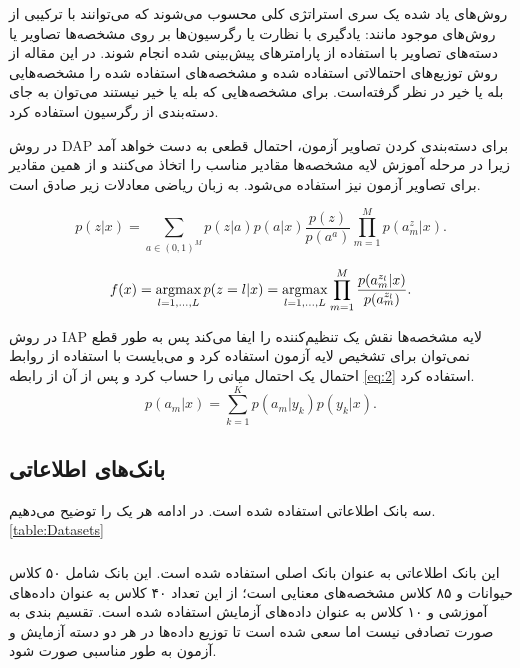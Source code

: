 روش‌های یاد شده یک سری استراتژی کلی محسوب می‌شوند که می‌توانند با ترکیبی از روش‌‌های موجود مانند: یادگیری با نظارت یا رگرسیون‌ها  بر روی مشخصه‌ها تصاویر یا دسته‌های تصاویر با استفاده از پارامتر‌های پیش‌بینی شده انجام شوند. در این مقاله از روش توزیع‌های احتمالاتی استفاده شده و مشخصه‌های استفاده شده را مشخصه‌هایی بله یا خیر در نظر گرفته‌است. برای مشخصه‌هایی که بله یا خیر نیستند می‌توان به جای دسته‌بندی از رگرسیون استفاده کرد.

در روش DAP برای دسته‌بندی کردن تصاویر آزمون، احتمال قطعی به دست خواهد آمد زیرا در مرحله آموزش لایه مشخصه‌ها مقادیر مناسب را اتخاذ می‌کنند و از همین مقادیر برای تصاویر آزمون نیز استفاده می‌شود. به زبان ریاضی معادلات زیر صادق است.


\begin{equation}
p(z|x) = \sum_{a\in(0,1)^{M}} p(z|a)p(a|x)\dfrac{p(z)}{p(a^{a})}\prod_{m=1}^{M} p(a_{m}^{z}|x).
\end{equation}

\begin{equation}
f(x) = \operatorname*{argmax}\limits_{l=1,...,L} p(z=l|x) = \operatorname*{argmax}\limits_{l=1,...,L} \prod_{m=1}^{M} \dfrac{p(a_{m}^{z_{l}}|x)}{p(a_{m}^{z_{l}})}.
\label{eq:2}
\end{equation}

در روش IAP لایه مشخصه‌ها نقش یک تنظیم‌کننده را ایفا می‌کند پس به طور قطع نمی‌توان برای تشخیص لایه آزمون استفاده کرد و می‌بایست با استفاده از روابط احتمال یک احتمال میانی را حساب کرد و پس از آن از رابطه
\ref{eq:2}
استفاده کرد.
\begin{equation}
p(a_{m}|x) = \sum_{k=1}^{K} p(a_{m}|y_{k})p(y_{k}|x).
\end{equation}


\subsection{بانک‌های اطلاعاتی}
سه بانک اطلاعاتی استفاده شده است. در ادامه هر یک را توضیح می‌دهیم.
\ref{table:Datasets}
\subsubsection{}

این بانک اطلاعاتی به عنوان بانک اصلی استفاده شده است. این بانک شامل ۵۰ کلاس حیوانات و ۸۵ کلاس مشخصه‌های معنایی است؛ از این تعداد ۴۰ کلاس به عنوان داده‌های آموزشی و ۱۰ کلاس به عنوان داده‌های آزمایش استفاده شده است. تقسیم بندی به صورت تصادفی نیست اما سعی شده است تا توزیع داده‌ها در هر دو دسته آزمایش و آزمون به طور مناسبی صورت شود.

